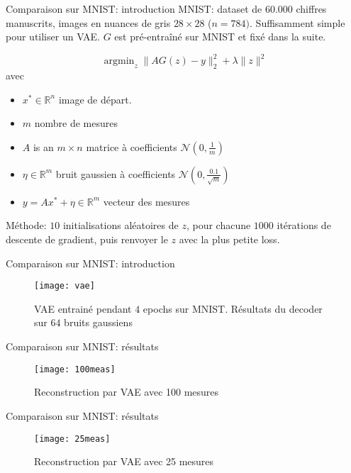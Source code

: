 \documentclass{beamer}
\begin{document}
\begin{frame}{Comparaison sur MNIST: introduction}
MNIST: dataset de 60.000 chiffres manuscrits, images en nuances de gris $28\times 28$ ($n=784)$. Suffisamment simple pour utiliser un VAE.\newline
$G$ est pré-entraîné sur MNIST et fixé dans la suite.
\vspace{1em}

$$\operatorname{argmin}_z \|AG(z)-y\|_2^2 +\lambda \|z\|^2$$
avec \begin{itemize}
\item  $x^*\in \mathbb R^n$ image de départ.
\item $m$ nombre de mesures 
\item $A$ is an $m\times n$ matrice à coefficients $\mathcal N(0,\frac 1m)$
\item $\eta \in \mathbb R^m$ bruit gaussien à coefficients $\mathcal N(0,\frac{0.1}{\sqrt m})$
\item $y = Ax^* + \eta \in \mathbb R^m$ vecteur des mesures
\end{itemize}
\vspace{1em}

Méthode: $10$ initialisations aléatoires de $z$, pour chacune $1000$ itérations de descente de gradient, puis renvoyer le $z$ avec la plus petite loss.
    
\end{frame}

\begin{frame}{Comparaison sur MNIST: introduction}
\begin{figure}
\texttt{[image: vae]}
\caption{VAE entrainé pendant $4$ epochs sur MNIST. Résultats du decoder sur $64$ bruits gaussiens} 
\end{figure}
\end{frame}

\begin{frame}{Comparaison sur MNIST: résultats}
\begin{figure}
\texttt{[image: 100meas]}
\caption{Reconstruction par VAE avec 100 mesures} 
\end{figure}
\end{frame}

\begin{frame}{Comparaison sur MNIST: résultats}
\begin{figure}
\texttt{[image: 25meas]}
\caption{Reconstruction par VAE avec 25 mesures} 
\end{figure}
\end{frame}
\end{document}
